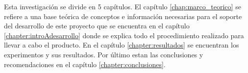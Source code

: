 

Esta investigaci\'on se divide en 5 cap\'itulos. El cap\'itulo \ref{chap:marco_teorico} se refiere a una base te\'orica de conceptos e informaci\'on necesarias para el soporte del desarrollo de este proyecto que se encuentra en el cap\'itulo  \ref{chapter:introAdesarrollo} donde se explica todo el procedimiento realizado para llevar a cabo el producto. En el cap\'itulo \ref{chapter:resultados} se encuentran  los experimentos y sus resultados. Por \'ultimo estan las conclusiones y recomendaciones en el capítulo \ref{chapter:conclusiones}. 